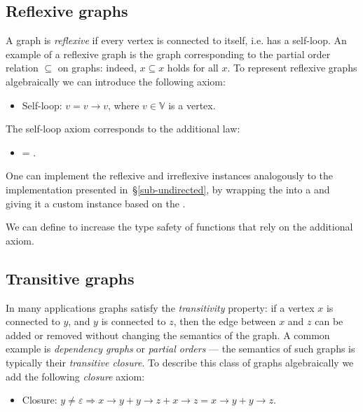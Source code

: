 \subsection{Reflexive graphs}\label{sub-reflexive}

A graph is \emph{reflexive} if every vertex is connected to itself, i.e. has a self-loop.
An example of a reflexive graph is the graph corresponding to the partial
order relation $\subseteq$ on graphs: indeed, $x \subseteq x$ holds for all $x$. To
represent reflexive graphs algebraically we can introduce the following axiom:

\begin{itemize}
    \item Self-loop: $v = v \rightarrow v$, where $v\in \mathbb{V}$ is a vertex.
\end{itemize}

\noindent
The self-loop axiom corresponds to the additional  law:

\begin{itemize}
    \item {} = .
\end{itemize}

One can implement the reflexive and irreflexive  instances analogously to
the  implementation presented in~\S\ref{sub-undirected}, by wrapping the
 into a  and giving it a custom  instance based on the
.

We can define
to increase the type safety of functions that rely on the additional axiom.

\subsection{Transitive graphs}\label{sub-transitive}

In many applications graphs satisfy the \emph{transitivity} property: if a vertex $x$ is
connected to $y$, and $y$ is connected to $z$, then the edge between $x$ and $z$ can be
added or removed without changing the semantics of the graph. A common example is
\emph{dependency graphs} or \emph{partial orders} --- the semantics of such graphs is
typically their \emph{transitive closure}.
To describe this class of graphs algebraically we add the following \emph{closure} axiom:

\begin{itemize}
    \item Closure: $y \neq \varepsilon \Rightarrow x \rightarrow y + y \rightarrow z +
    x \rightarrow z = x \rightarrow y + y \rightarrow z$.
\end{itemize}

